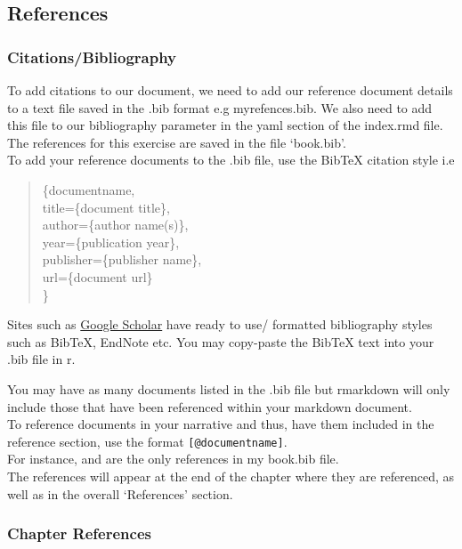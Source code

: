 \documentclass[
]{book}
\begin{document}
\hypertarget{references}{%
\subsection{References}\label{references}}

\hypertarget{citationsbibliography}{%
\subsubsection{Citations/Bibliography}\label{citationsbibliography}}

To add citations to our document, we need to add our reference document details to a text file saved in the .bib format e.g myrefences.bib. We also need to add this file to our bibliography parameter in the yaml section of the index.rmd file.\\
The references for this exercise are saved in the file `book.bib'.\\
To add your reference documents to the .bib file, use the BibTeX citation style i.e

\begin{quote}
\citet{documentype}\{documentname,\\
title=\{document title\},\\
author=\{author name(s)\},\\
year=\{publication year\},\\
publisher=\{publisher name\},\\
url=\{document url\}\\
\}
\end{quote}

Sites such as \href{https://scholar.google.com/}{Google Scholar} have ready to use/ formatted bibliography styles such as BibTeX, EndNote etc. You may copy-paste the BibTeX text into your .bib file in r.

You may have as many documents listed in the .bib file but rmarkdown will only include those that have been referenced within your markdown document.\\
To reference documents in your narrative and thus, have them included in the reference section, use the format \texttt{{[}@documentname{]}}.\\
For instance, \citep{xie2015} and \citep{team2013r} are the only references in my book.bib file.\\
The references will appear at the end of the chapter where they are referenced, as well as in the overall `References' section.

\hypertarget{chapter-references}{%
\subsubsection{Chapter References}\label{chapter-references}}
\end{document}

